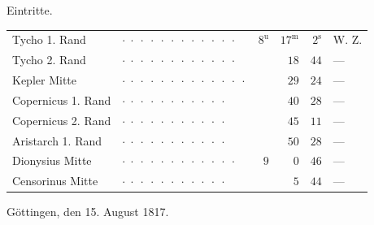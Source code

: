 \par\indent Eintritte.
\begin{center}\fontsize{10}{12}\selectfont\setlength{\tabcolsep}{3pt}\begin{tabular}{llrrrl}
Tycho 1. Rand & $\cdot\;\cdot\;\cdot\;\cdot\;\cdot\;\cdot\;\cdot\;\cdot\;\cdot\;\cdot\;\cdot\;\cdot$ &  $8^{\mathrm u}$ & $17^{\mathrm m}$ & $2^{\mathrm s}$ & W. Z.\\
Tycho 2. Rand & $\cdot\;\cdot\;\cdot\;\cdot\;\cdot\;\cdot\;\cdot\;\cdot\;\cdot\;\cdot\;\cdot\;\cdot$ &  & $18$ & $44$ & —\\
Kepler Mitte & $\cdot\;\cdot\;\cdot\;\cdot\;\cdot\;\cdot\;\cdot\;\cdot\;\cdot\;\cdot\;\cdot\;\cdot\;\cdot$ &  & $29$ & $24$ & —\\
Copernicus 1. Rand & $\cdot\;\cdot\;\cdot\;\cdot\;\cdot\;\cdot\;\cdot\;\cdot\;\cdot\;\cdot\;\cdot$ &  & $40$ & $28$ & —\\
Copernicus 2. Rand & $\cdot\;\cdot\;\cdot\;\cdot\;\cdot\;\cdot\;\cdot\;\cdot\;\cdot\;\cdot\;\cdot$ &  & $45$ & $11$ & —\\
Aristarch 1. Rand & $\cdot\;\cdot\;\cdot\;\cdot\;\cdot\;\cdot\;\cdot\;\cdot\;\cdot\;\cdot\;\cdot$ &  & $50$ & $28$ & —\\
Dionysius Mitte & $\cdot\;\cdot\;\cdot\;\cdot\;\cdot\;\cdot\;\cdot\;\cdot\;\cdot\;\cdot\;\cdot\;\cdot$ &  $9$ & $0$ & $46$ & —\\
Censorinus Mitte & $\cdot\;\cdot\;\cdot\;\cdot\;\cdot\;\cdot\;\cdot\;\cdot\;\cdot\;\cdot\;\cdot$ &  & $5$ & $44$ & —\\
\end{tabular}\end{center}

\begin{flushright}Göttingen, den 15. August 1817.\end{flushright}

